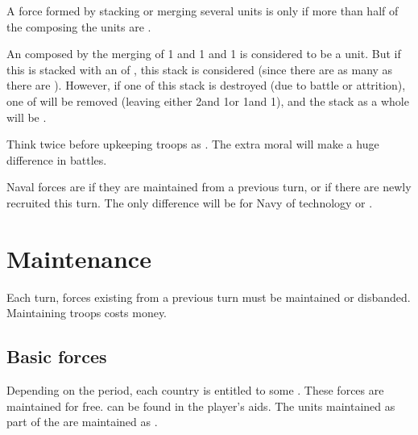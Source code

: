  A force formed by stacking or merging several units is
 only if more than half of the \LD composing the units are
.
\begin{exemple}
  An \ARMY\faceplus composed by the merging of 1  \LD and 1
   \ARMY\facemoins and 1  \LD is considered to
  be a  unit. But if this \ARMY\faceplus is stacked with an
  \ARMY\facemoins of , this stack is considered
   (since there are as many  as there are
  ). However, if one \LD of this stack is destroyed (due to
  battle or attrition), one \LD of  will be removed (leaving
  either 2\ARMY\facemoins and 1\LD or 1\ARMY\faceplus and 1\LD), and the stack
  as a whole will be .
\end{exemple}

\begin{designnote}
  Think twice before upkeeping troops as . The extra moral
  will make a huge difference in battles.
\end{designnote}

\aparag[Navy] Naval forces are  if they are maintained from a
previous turn, or  if there are newly recruited this turn.
\bparag The only difference will be for Navy of technology  or
.%





\section{Maintenance}

\aparag Each turn, forces existing from a previous turn must be maintained or
disbanded. Maintaining troops costs money.



\subsection{Basic forces}

\aparag Depending on the period, each country is entitled to some . These forces are maintained for free.  can be
found in the player's aids.
\bparag The units maintained as part of the  are
maintained as .

